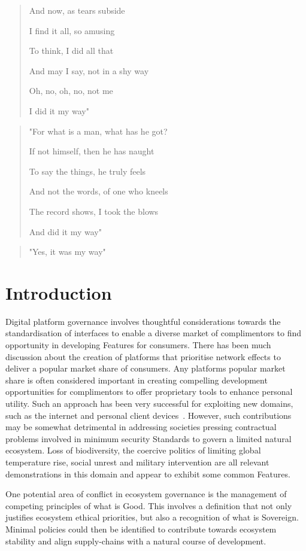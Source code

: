 \documentclass[11pt, oneside]{book}   	%
\begin{document}
\begin{small}
\begin{quote}
	And now, as tears subside

	I find it all, so amusing

	To think, I did all that

	And may I say, not in a shy way

	Oh, no, oh, no, not me

	I did it my way"
\end{quote}

\begin{quote}
	"For what is a man, what has he got?

	If not himself, then he has naught

	To say the things, he truly feels

	And not the words, of one who kneels

	The record shows, I took the blows

	And did it my way"
\end{quote}

\begin{quote}
	"Yes, it was my way"~\cite{mway1}
\end{quote}
\end{small}

\pagebreak

\chapter{Introduction}
Digital platform governance involves thoughtful considerations towards the standardisation of interfaces to enable a diverse market of complimentors to find opportunity in developing Features for consumers.
There has been much discussion about the creation of platforms that prioritise network effects to deliver a popular market share of consumers.
Any platforms popular market share is often considered important in creating compelling development opportunities for complimentors to offer proprietary tools to enhance personal utility.
Such an approach has been very successful for exploiting new domains, such as the internet and personal client devices~\cite{bop1}.
However, such contributions may be somewhat detrimental in addressing societies pressing contractual problems involved in minimum security Standards to govern a limited natural ecosystem.
Loss of biodiversity, the coercive politics of limiting global temperature rise, social unrest and military intervention are all relevant demonstrations in this domain and appear to exhibit some common Features.\

One potential area of conflict in ecosystem governance is the management of competing principles of what is Good.
This involves a definition that not only justifies ecosystem ethical priorities, but also a recognition of what is Sovereign.
Minimal policies could then be identified to contribute towards ecosystem stability and align supply-chains with a natural course of development.\
\end{document}
